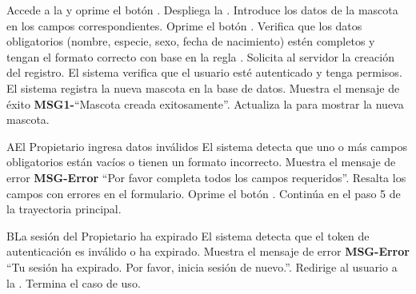   \begin{UCtrayectoria}
      \UCpaso[\UCactor] Accede a la  y oprime el botón .
      \UCpaso Despliega la .
      \UCpaso[\UCactor] Introduce los datos de la mascota en los campos correspondientes. \label{CU-CreatePet-FillForm}
      \UCpaso[\UCactor] Oprime el botón .
      \UCpaso Verifica que los datos obligatorios (nombre, especie, sexo, fecha de nacimiento) estén completos y tengan el formato correcto con base en la regla .
      \UCpaso Solicita al servidor la creación del registro.
      \UCpaso El sistema verifica que el usuario esté autenticado y tenga permisos.
      \UCpaso El sistema registra la nueva mascota en la base de datos.
      \UCpaso Muestra el mensaje de éxito {\bf MSG1-}``Mascota creada exitosamente''.
      \UCpaso Actualiza la  para mostrar la nueva mascota.
  \end{UCtrayectoria}
  
  
  \begin{UCtrayectoriaA}{A}{El Propietario ingresa datos inválidos}
      \UCpaso El sistema detecta que uno o más campos obligatorios están vacíos o tienen un formato incorrecto.
      \UCpaso Muestra el mensaje de error {\bf MSG-Error} ``Por favor completa todos los campos requeridos''.
      \UCpaso Resalta los campos con errores en el formulario.
      \UCpaso[\UCactor] Oprime el botón .
      \UCpaso Continúa en el paso 5 de la trayectoria principal.
  \end{UCtrayectoriaA}
  
  \begin{UCtrayectoriaA}{B}{La sesión del Propietario ha expirado}
      \UCpaso El sistema detecta que el token de autenticación es inválido o ha expirado.
      \UCpaso Muestra el mensaje de error {\bf MSG-Error} ``Tu sesión ha expirado. Por favor, inicia sesión de nuevo.''.
      \UCpaso Redirige al usuario a la .
      \UCpaso Termina el caso de uso.
  \end{UCtrayectoriaA}
  
